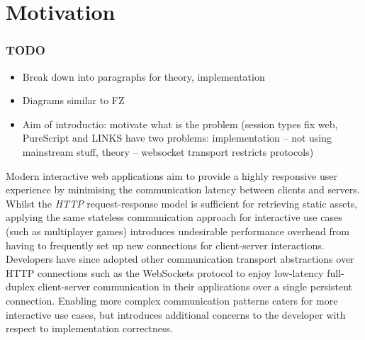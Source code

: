 \section{Motivation}
\label{section:intro}

\subsubsection{TODO}
\begin{itemize}
\item Break down into paragraphs for theory, implementation
\item Diagrams similar to FZ
\item Aim of introductio: motivate what is the problem 
(session types fix web, PureScript and LINKS have two problems: 
implementation -- not using mainstream stuff, 
theory -- websocket transport restricts protocols)
\end{itemize}





Modern interactive web applications aim to 
provide a highly responsive user experience by 
minimising the communication latency between clients and servers. 
Whilst the \textit{HTTP} request-response model is 
sufficient for retrieving static assets, applying the same 
stateless communication approach for interactive use cases 
(such as multiplayer games) introduces undesirable 
performance overhead from having to frequently set up 
new connections for client-server interactions. 
Developers have since adopted other communication 
transport abstractions over HTTP connections such as the WebSockets protocol \cite{WebSocketRFC} to enjoy low-latency full-duplex 
client-server communication in their applications over 
a single persistent connection. 
Enabling more complex communication patterns caters for 
more interactive use cases, but introduces additional 
concerns to the developer with respect to implementation correctness.

